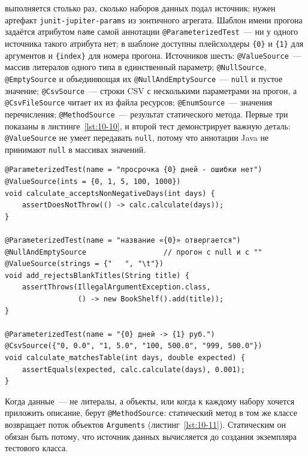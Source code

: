  выполняется столько раз, сколько наборов данных подал источник; нужен артефакт \texttt{junit-jupiter-params} из зонтичного агрегата. Шаблон имени прогона задаётся атрибутом \texttt{name} самой аннотации \texttt{@ParameterizedTest}~--- ни у одного источника такого атрибута нет; в шаблоне доступны плейсхолдеры \texttt{\{0\}} и \texttt{\{1\}} для аргументов и \texttt{\{index\}} для номера прогона. Источников шесть: \texttt{@ValueSource}~--- массив литералов одного типа в единственный параметр; \texttt{@NullSource}, \texttt{@EmptySource} и объединяющая их \texttt{@NullAndEmptySource}~--- \texttt{null} и пустое значение; \texttt{@CsvSource}~--- строки CSV с несколькими параметрами на прогон, а \texttt{@CsvFileSource} читает их из файла ресурсов; \texttt{@EnumSource}~--- значения перечисления; \texttt{@MethodSource}~--- результат статического метода. Первые три показаны в листинге~\ref{lst:10-10}, и второй тест демонстрирует важную деталь: \texttt{@ValueSource} не умеет передавать \texttt{null}, потому что аннотации Java не принимают \texttt{null} в массивах значений.

\begin{listing}[H]
\begin{verbatim}
@ParameterizedTest(name = "просрочка {0} дней - ошибки нет")
@ValueSource(ints = {0, 1, 5, 100, 1000})
void calculate_acceptsNonNegativeDays(int days) {
    assertDoesNotThrow(() -> calc.calculate(days));
}

@ParameterizedTest(name = "название «{0}» отвергается")
@NullAndEmptySource                  // прогон с null и с ""
@ValueSource(strings = {"   ", "\t"})
void add_rejectsBlankTitles(String title) {
    assertThrows(IllegalArgumentException.class,
                 () -> new BookShelf().add(title));
}

@ParameterizedTest(name = "{0} дней -> {1} руб.")
@CsvSource({"0, 0.0", "1, 5.0", "100, 500.0", "999, 500.0"})
void calculate_matchesTable(int days, double expected) {
    assertEquals(expected, calc.calculate(days), 0.001);
}
\end{verbatim}
\caption{Источники @ValueSource, @NullAndEmptySource и @CsvSource}
\label{lst:10-10}
\end{listing}

Когда данные~--- не литералы, а объекты, или когда к каждому набору хочется приложить описание, берут \texttt{@MethodSource}: статический метод в том же классе возвращает поток объектов \texttt{Arguments} (листинг~\ref{lst:10-11}). Статическим он обязан быть потому, что источник данных вычисляется до создания экземпляра тестового класса.

